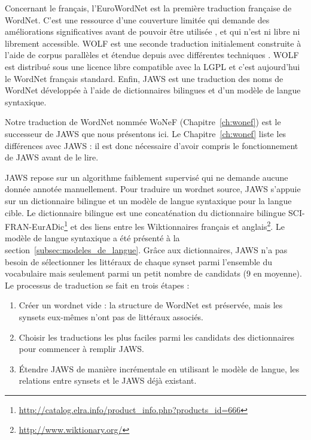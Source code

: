 Concernant le français, l'EuroWordNet \citep{vossen1998eurowordnet} est la
première traduction française de WordNet. C'est une ressource d'une couverture
limitée qui demande des améliorations significatives avant de pouvoir être
utilisée \citep{jacquin2006systemes}, et qui n'est ni libre ni librement
accessible. WOLF est une seconde traduction initialement construite à l'aide de
corpus parallèles \citep{sagot2008construction} et étendue depuis avec
différentes techniques \citep{apidianaki2012applying}. WOLF est distribué sous
une licence libre compatible avec la LGPL et c'est aujourd'hui le WordNet
français standard. Enfin, JAWS \citep{mouton2010jaws} est une traduction des
noms de WordNet développée à l'aide de dictionnaires bilingues et d'un modèle
de langue syntaxique.

\label{subsec:jaws_translation_process}

Notre traduction de WordNet nommée WoNeF (Chapitre~\ref{ch:wonef}) est le
successeur de JAWS \citep{mouton2010jaws,mouton2010phd} que nous présentons
ici. Le Chapitre~\ref{ch:wonef} liste les différences avec JAWS : il est donc
nécessaire d'avoir compris le fonctionnement de JAWS avant de le lire.

JAWS repose sur un algorithme faiblement supervisé qui ne demande aucune donnée
annotée manuellement. Pour traduire un wordnet source, JAWS s'appuie sur un
dictionnaire bilingue et un modèle de langue syntaxique pour la langue cible.
Le dictionnaire bilingue est une concaténation du dictionnaire bilingue
SCI-FRAN-EurADic\footnote{\url{http://catalog.elra.info/product_info.php?products_id=666}}
et des liens entre les Wiktionnaires français et
anglais\footnote{\url{http://www.wiktionary.org/}}. Le modèle de langue
syntaxique a été présenté à la section~\ref{subsec:modeles_de_langue}. Grâce
aux dictionnaires, JAWS n'a pas besoin de sélectionner les littéraux de chaque
synset parmi l'ensemble du vocabulaire mais seulement parmi un petit nombre de
candidats (9 en moyenne).  Le processus de traduction se fait en trois étapes :

\begin{enumerate}
    
    \item Créer un wordnet vide : la structure de WordNet est préservée, mais
        les synsets eux-mêmes n'ont pas de littéraux associés.

    \item Choisir les traductions les plus faciles parmi les candidats des
    dictionnaires pour commencer à remplir JAWS.

    \item Étendre JAWS de manière incrémentale en utilisant le modèle de
        langue, les relations entre synsets et le JAWS déjà existant.

\end{enumerate}

